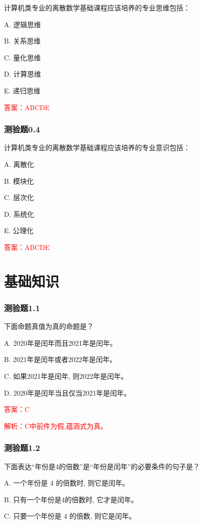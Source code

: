 \documentclass[UTF8, heading=true]{ctexart}
\begin{document}
计算机类专业的离散数学基础课程应该培养的专业思维包括：

A. 逻辑思维

B. 关系思维

C. 量化思维

D. 计算思维

E. 递归思维

\textcolor{red}{答案：ABCDE}

\subsubsection{测验题0.4}

计算机类专业的离散数学基础课程应该培养的专业意识包括：

A. 离散化

B. 模块化

C. 层次化

D. 系统化

E. 公理化

\textcolor{red}{答案：ABCDE}

\clearpage

\section{基础知识}

\subsubsection{测验题1.1}

下面命题真值为真的命题是？

A. 2020年是闰年而且2021年是闰年。

B. 2021年是闰年或者2022年是闰年。

C. 如果2021年是闰年, 则2022年是闰年。

D. 2020年是闰年当且仅当2021年是闰年。

\textcolor{red}{答案：C}

\textcolor{red}{解析：C中前件为假,蕴涵式为真。}

\subsubsection{测验题1.2}
下面表达“年份是4的倍数”是“年份是闰年”的必要条件的句子是？

A. 一个年份是 4 的倍数时, 则它是闰年。

B. 只有一个年份是4的倍数时, 它才是闰年。

C. 只要一个年份是 4 的倍数, 则它是闰年。
\end{document}
